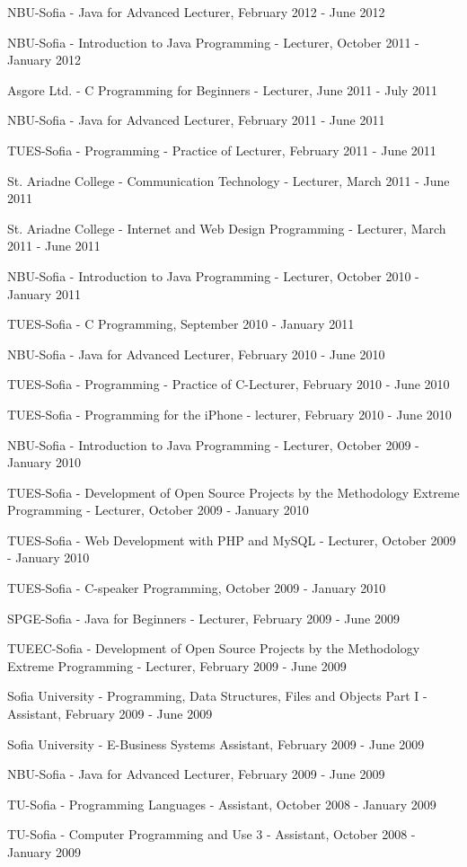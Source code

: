 \documentclass[english,a4paper]{europasscv}
\begin{document}
\begin{europasscv}
{\begin{ecvitemize}
    \item NBU-Sofia - Java for Advanced Lecturer, February 2012 - June 2012
    \item NBU-Sofia - Introduction to Java Programming - Lecturer, October 2011 - January 2012
    \item Asgore Ltd. - C Programming for Beginners - Lecturer, June 2011 - July 2011
    \item NBU-Sofia - Java for Advanced Lecturer, February 2011 - June 2011
    \item TUES-Sofia - Programming - Practice of Lecturer, February 2011 - June 2011
    \item St. Ariadne College - Communication Technology - Lecturer, March 2011 - June 2011
    \item St. Ariadne College - Internet and Web Design Programming - Lecturer, March 2011 - June 2011
    \item NBU-Sofia - Introduction to Java Programming - Lecturer, October 2010 - January 2011
    \item TUES-Sofia - C Programming, September 2010 - January 2011
    \item NBU-Sofia - Java for Advanced Lecturer, February 2010 - June 2010
    \item TUES-Sofia - Programming - Practice of C-Lecturer, February 2010 - June 2010
    \item TUES-Sofia - Programming for the iPhone - lecturer, February 2010 - June 2010
    \item NBU-Sofia - Introduction to Java Programming - Lecturer, October 2009 - January 2010
    \item TUES-Sofia - Development of Open Source Projects by the Methodology Extreme Programming - Lecturer, October 2009 - January 2010
    \item TUES-Sofia - Web Development with PHP and MySQL - Lecturer, October 2009 - January 2010
    \item TUES-Sofia - C-speaker Programming, October 2009 - January 2010
    \item SPGE-Sofia - Java for Beginners - Lecturer, February 2009 - June 2009
    \item TUEEC-Sofia - Development of Open Source Projects by the Methodology Extreme Programming - Lecturer, February 2009 - June 2009
    \item Sofia University - Programming, Data Structures, Files and Objects Part I - Assistant, February 2009 - June 2009
    \item Sofia University - E-Business Systems Assistant, February 2009 - June 2009
    \item NBU-Sofia - Java for Advanced Lecturer, February 2009 - June 2009
    \item TU-Sofia - Programming Languages - Assistant, October 2008 - January 2009
    \item TU-Sofia - Computer Programming and Use 3 - Assistant, October 2008 - January 2009 
  \end{ecvitemize}}
  

\end{europasscv}
\end{document}
